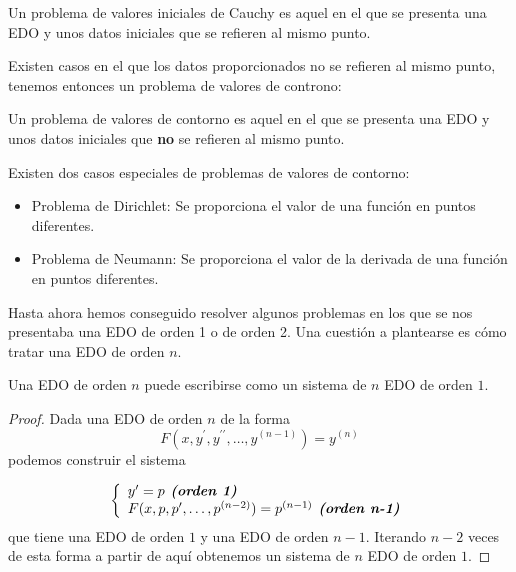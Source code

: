 \documentclass{mathnotes}
\begin{document}
\begin{definition}
Un problema de valores iniciales de Cauchy es aquel en el que se presenta una EDO y unos datos iniciales que se refieren al mismo punto.
\end{definition}

Existen casos en el que los datos proporcionados no se refieren al mismo punto, tenemos entonces un problema de valores de controno: 

\begin{definition}
Un problema de valores de contorno es aquel en el que se presenta una EDO y unos datos iniciales que \textbf{no} se refieren al mismo punto.
\end{definition}

Existen dos casos especiales de problemas de valores de contorno:
\begin{itemize}
\item Problema de Dirichlet: Se proporciona el valor de una función en puntos diferentes.
\item Problema de Neumann: Se proporciona el valor de la derivada de una función en puntos diferentes.
\end{itemize}

Hasta ahora hemos conseguido resolver algunos problemas en los que se nos presentaba una EDO de orden 1 o de orden 2. Una cuestión a plantearse es cómo tratar una EDO de orden $n$.

\begin{lemma}
Una EDO de orden $n$ puede escribirse como un sistema de $n$ EDO de orden $1$.
\end{lemma}

\begin{proof}
Dada una EDO de orden $n$ de la forma $$F(x,y^\prime,y^{\prime\prime},\hdots, y^{(n-1)}) = y^{(n)}$$ podemos construir el sistema

\begin{equation*}
  \left\lbrace
  \begin{array}{l}
     y^\prime=p \textit{\textbf{ (orden 1)}}\\
     F(x,p,p^\prime,\hdots, p^{(n-2)}) = p^{(n-1)} \textit{\textbf{ (orden n-1)}}\\
  \end{array}
  \right.
\end{equation*}
que tiene una EDO de orden $1$ y una EDO de orden $n-1$. Iterando $n-2$ veces de esta forma a partir de aquí obtenemos un sistema de $n$ EDO de orden $1$.
\end{proof}
\end{document}
